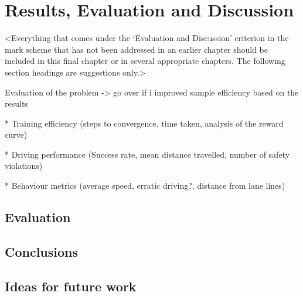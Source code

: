 \chapter{Results, Evaluation and Discussion}
\label{chapter4}

<Everything that comes under the `Evaluation and Discussion' criterion in the mark scheme that has not been addressed in an earlier chapter should be included in this final chapter or in several appropriate chapters. The following section headings are suggestions only.>

Evaluation of the problem -> go over if i improved sample efficiency based on the results

* Training efficiency (steps to convergence, time taken, analysis of the reward curve)

* Driving performance (Success rate, mean distance travelled, number of safety violations)

* Behaviour metrics (average speed, erratic driving?, distance from lane lines)

\section{Evaluation}
\lipsum[13]

\section{Conclusions}
\lipsum[13]

\section{Ideas for future work}
\lipsum[14]

